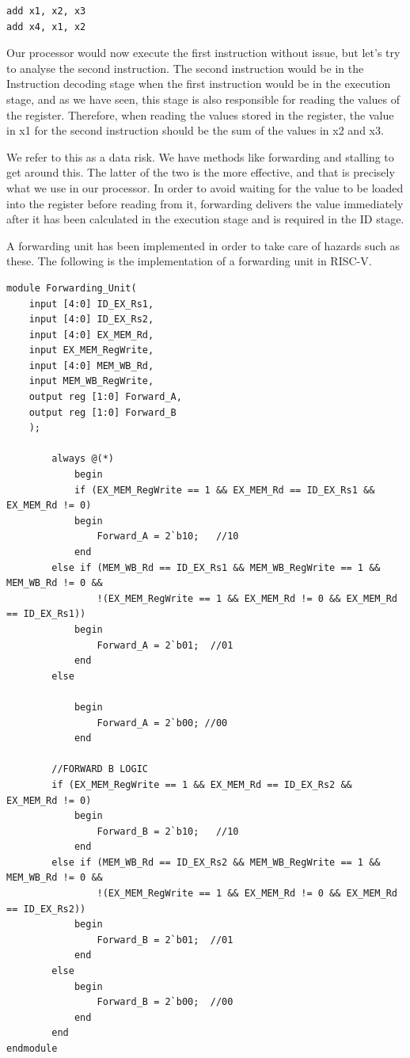 \documentclass{article}
\begin{document}
\begin{lstlisting}[caption={IF/ID Register}, captionpos=b, language=RISC-V]
add x1, x2, x3
add x4, x1, x2
\end{lstlisting}

Our processor would now execute the first instruction without issue, but let's try to analyse the second instruction. The second instruction would be in the Instruction decoding stage when the first instruction would be in the execution stage, and as we have seen, this stage is also responsible for reading the values of the register. Therefore, when reading the values stored in the register, the value in x1 for the second instruction should be the sum of the values in x2 and x3. 

We refer to this as a data risk. We have methods like forwarding and stalling to get around this. The latter of the two is the more effective, and that is precisely what we use in our processor. In order to avoid waiting for the value to be loaded into the register before reading from it, forwarding delivers the value immediately after it has been calculated in the execution stage and is required in the ID stage.

A forwarding unit has been implemented in order to take care of hazards such as these. The following is the implementation of a forwarding unit in RISC-V. 

\begin{lstlisting}[caption={IF/ID Register}, captionpos=b, language=RISC-V]
module Forwarding_Unit(
    input [4:0] ID_EX_Rs1,
    input [4:0] ID_EX_Rs2,
    input [4:0] EX_MEM_Rd,
    input EX_MEM_RegWrite,
    input [4:0] MEM_WB_Rd,
    input MEM_WB_RegWrite,
    output reg [1:0] Forward_A,
    output reg [1:0] Forward_B
    );
    
        always @(*)
            begin
            if (EX_MEM_RegWrite == 1 && EX_MEM_Rd == ID_EX_Rs1 && EX_MEM_Rd != 0)
            begin
                Forward_A = 2`b10;   //10
            end
        else if (MEM_WB_Rd == ID_EX_Rs1 && MEM_WB_RegWrite == 1 && MEM_WB_Rd != 0 &&
                !(EX_MEM_RegWrite == 1 && EX_MEM_Rd != 0 && EX_MEM_Rd == ID_EX_Rs1))
            begin
                Forward_A = 2`b01;  //01
            end
        else

            begin
                Forward_A = 2`b00; //00
            end

        //FORWARD B LOGIC
        if (EX_MEM_RegWrite == 1 && EX_MEM_Rd == ID_EX_Rs2 && EX_MEM_Rd != 0)
            begin
                Forward_B = 2`b10;   //10
            end
        else if (MEM_WB_Rd == ID_EX_Rs2 && MEM_WB_RegWrite == 1 && MEM_WB_Rd != 0 &&
                !(EX_MEM_RegWrite == 1 && EX_MEM_Rd != 0 && EX_MEM_Rd == ID_EX_Rs2))
            begin
                Forward_B = 2`b01;  //01
            end
        else  
            begin
                Forward_B = 2`b00;  //00
            end
        end
endmodule
\end{lstlisting}
\end{document}
